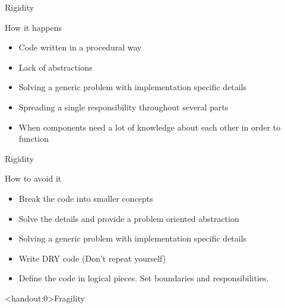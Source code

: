 \documentclass[xcolor=svgnames, handout]{beamer}
\begin{document}
{%
%
\begin{frame}{Rigidity}

    How it happens
    \begin{itemize}
        \item<1-> Code written in a procedural way
        \item<2-> Lack of abstractions
        \item<3-> Solving a generic problem with implementation specific details
        \item<4-> Spreading a single responsibility throughout several parts
        \item<5-> When components need a lot of knowledge about each other in
            order to function
    \end{itemize}
\end{frame}
}


{%
%
\begin{frame}{Rigidity}

    How to avoid it
    \begin{itemize}
        \item<1-> Break the code into smaller concepts
        \item<2-> Solve the details and provide a problem oriented abstraction
        \item<3-> Solving a generic problem with implementation specific details
        \item<4-> Write DRY code (Don't repeat yourself)
        \item<5-> Define the code in logical pieces.  Set boundaries and
            responsibilities.
    \end{itemize}
\end{frame}
}


{%
%
\begin{frame}<handout:0>{Fragility}
\end{frame}
}
\end{document}
